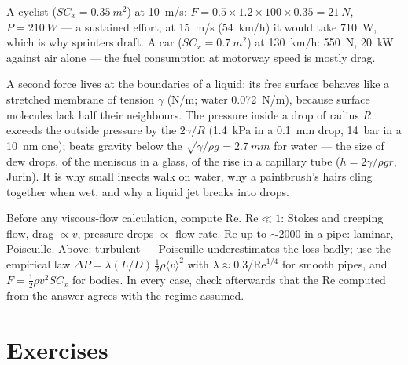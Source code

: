 \begin{example}\label{ex:b2:viscous-flows:cyclist}
A cyclist ($SC_x = \qty{0.35}{m^2}$) at \qty{10}{m/s}: $F = 0.5 \times 1.2 \times 100
\times 0.35 = \qty{21}{N}$, $P = \qty{210}{W}$ --- a sustained effort; at \qty{15}{m/s}
(\qty{54}{km/h}) it would take \qty{710}{W}, which is why sprinters draft.
A car ($SC_x = \qty{0.7}{m^2}$) at \qty{130}{km/h}: \qty{550}{N}, \qty{20}{kW} against
air alone --- the fuel consumption at motorway speed is mostly drag.
\end{example}

\begin{remark}\label{rem:b2:viscous-flows:capillarity}
A second force lives at the boundaries of a liquid: its free surface
behaves like a stretched membrane of tension $\gamma$ (\unit{N/m}; water
\qty{0.072}{N/m}), because surface molecules lack half their neighbours.
The pressure inside a drop of radius $R$ exceeds the outside pressure by
the \emph{} $2\gamma/R$ (\qty{1.4}{kPa} in a \qty{0.1}{mm} drop,
\qty{14}{bar} in a \qty{10}{nm} one);  beats gravity below
the \emph{} $\sqrt{\gamma/\rho g} = \qty{2.7}{mm}$ for water ---
the size of dew drops, of the meniscus in a glass, of the rise in a
capillary tube ($h = 2\gamma/\rho gr$, Jurin). It is why small insects walk
on water, why a paintbrush's hairs cling together when wet, and why a
liquid jet breaks into drops.
\end{remark}

\begin{method}\label{met:b2:viscous-flows:regime}
Before any viscous-flow calculation, compute $\mathrm{Re}$. $\mathrm{Re} \ll 1$:
Stokes and creeping flow, drag $\propto v$, pressure drops $\propto$ flow
rate. $\mathrm{Re}$ up to $\sim\!2000$ in a pipe: laminar, Poiseuille. Above:
turbulent --- Poiseuille underestimates the loss badly; use the
empirical law $\Delta P = \lambda(L/D)\,\tfrac12\rho\langle v\rangle^2$ with $\lambda
\approx 0.3/\mathrm{Re}^{1/4}$ for smooth pipes, and $F = \tfrac12\rho v^2SC_x$ for
bodies. In every case, check afterwards that the $\mathrm{Re}$ computed
from the answer agrees with the regime assumed.
\end{method}

\section{Exercises}

